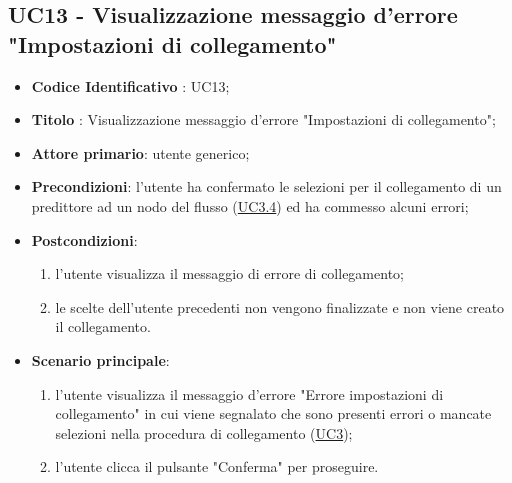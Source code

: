 	\subsection{UC13 - Visualizzazione messaggio d'errore "Impostazioni di collegamento"}
		\begin{itemize}
			\item\textbf{Codice Identificativo} : UC13;
			\item\textbf{Titolo} : Visualizzazione messaggio d'errore "Impostazioni di collegamento";
			\item\textbf{Attore primario}: utente generico;
			\item\textbf{Precondizioni}: l'utente ha confermato le selezioni per il collegamento di un predittore ad un nodo del flusso (\hyperref[par:UC3.4]{UC3.4}) ed ha commesso alcuni errori;
			\item\textbf{Postcondizioni}:
				\begin{enumerate}
					\item l'utente visualizza il messaggio di errore di collegamento;
					\item le scelte dell'utente precedenti non vengono finalizzate e non viene creato il collegamento.
				\end{enumerate}		
			\item\textbf{Scenario principale}:
				\begin{enumerate}
					\item l'utente visualizza il messaggio d'errore "Errore impostazioni di collegamento" in cui viene segnalato che sono presenti errori o mancate selezioni nella procedura di collegamento (\hyperref[par:UC3]{UC3});
					\item l'utente clicca il pulsante "Conferma" per proseguire.		
				\end{enumerate}		
		\end{itemize}


		\label{par:UC14}

